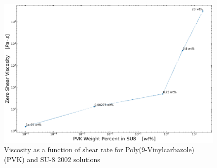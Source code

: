 \begin{figure}[!th]
\centering
\includegraphics[width=\textwidth]{./Figures/c_vs_v_PVKinSU8.png}
\decoRule
\caption[Viscosity as a function of shear rate for Poly(9-Vinylcarbazole) (PVK) and SU-8 2002 solutions]{Viscosity as a function of shear rate for Poly(9-Vinylcarbazole) (PVK) and SU-8 2002 solutions}
\label{fig:c_vs_v_PVKinSU8}
\end{figure}